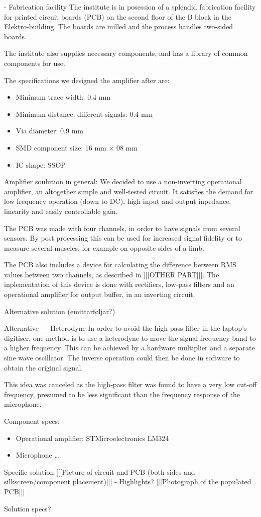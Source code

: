  - Fabrication facility
The institute is in posession of a splendid fabrication facility for printed circuit boards (PCB) on the second floor of the B block in the Elektro-building. The boards are milled and the process handles two-sided boards.

The institute also supplies necessary components, and has a library of common components for use.

The specifications we designed the amplifier after are:
\begin{itemize}
  \item Minimum trace width: 0.4 mm
  \item Minimum distance, different signals: 0.4 mm
  \item Via diameter: 0.9 mm
  \item SMD component size: 16 mm $\times$ 08 mm
  \item IC shape: SSOP
\end{itemize}


Amplifier soulution in general:
We decided to use a non-inverting operational amplifier, an altogether simple and well-tested circuit. It satisfies the demand for low frequency operation (down to DC), high input and output inpedance, linearity and easily controllable gain.

The PCB was made with four channels, in order to have signals from several sensors. By post processing this can be used for increased signal fidelity or to measure several muscles, for example on opposite sides of a limb.

The PCB also includes a device for calculating the difference between RMS values between two channels, as described in [[[OTHER PART]]]. The inplementation of this device is done with rectifiers, low-pass filters and an operational amplifier for output buffer, in an inverting circuit.

Alternative solution (emittarføljar?)

Alternative --- Heterodyne
In order to avoid the high-pass filter in the laptop's digitiser, one method is to use a heterodyne to move the signal frequency band to a higher frequency. This can be achieved by a hardware multiplier and a separate sine wave oscillator. The inverse operation could then be done in software to obtain the original signal.

This idea was canceled as the high-pass filter was found to have a very low cut-off frequency, presumed to be less significant than the frequency response of the microphone.

Component specs:
\begin{itemize}
  \item Operational amplifier: STMicroelectronics LM324
  \item Microphone …
\end{itemize}


Specific solution
[[[Picture of circuit and PCB (both sides and silkscreen/component placement)]]]
 - Highlights?
[[[Photograph of the populated PCB]]]

Solution specs?
